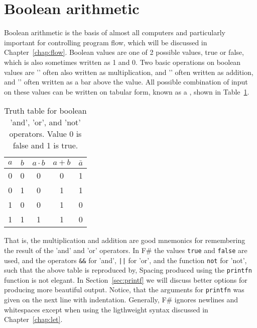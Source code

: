\section{Boolean arithmetic}
Boolean arithmetic is the basis of almost all computers and particularly important for controlling program flow, which will be discussed in Chapter~\ref{chap:flow}. Boolean values are one of 2 possible values, true or false, which is also sometimes written as 1 and 0. Two basic operations on boolean values are '' often also written as multiplication, and '' often written as addition, and '' often written as a bar above the value. All possible combination of input on these values can be written on tabular form, known as a , shown in Table~\ref{tab:truthTable}.
\begin{table}
  \centering
  \begin{tabular}{|c|c|c|c|c|}
    \hline
    $a$ & $b$ & $a\cdot b$& $a + b$&$\bar{a}$\\
    \hline
    0&0&0&0&1\\
    0&1&0&1&1\\
    1&0&0&1&0\\
    1&1&1&1&0\\
    \hline
  \end{tabular}
  \caption{Truth table for boolean 'and', 'or', and 'not' operators. Value 0 is false and 1 is true.}
  \label{tab:truthTable}
\end{table}
That is, the multiplication and addition are good mnemonics for remembering the result of the 'and' and 'or' operators. In F\# the values \lstinline|true| and \lstinline|false| are used, and the operators \lstinline|&&| for 'and', \lstinline+||+ for 'or', and the function \lstinline|not| for 'not', such that the above table is reproduced by,
%
%
%
Spacing produced using the \lstinline|printfn| function is not elegant. In Section~\ref{sec:printf} we will discuss better options for producing more beautiful output. Notice, that the arguments for \lstinline|printfn| was given on the next line with indentation. Generally, F\# ignores newlines and whitespaces except when using the ligthweight syntax discussed in Chapter~\ref{chap:let}.

